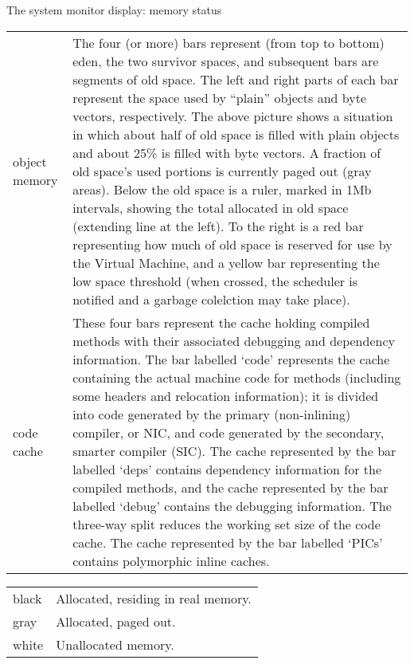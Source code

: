 \documentclass[letterpaper,10pt,english]{sphinxmanual}
\begin{document}
\begin{threeparttable}
\capstart\caption{The system monitor display: memory status}\label{\detokenize{monitor:id3}}
\noindent\begin{tabulary}{\linewidth}{p{5cm} p{10cm}}
\hline
{}\relax &\relax \\
\hline
object memory
&
The four (or more) bars represent (from top to bottom) eden, the two survivor spaces, and subsequent
bars are segments of old space. The left and right parts of each bar represent the space used
by “plain” objects and byte vectors, respectively. The above picture shows a situation in which
about half of old space is filled with plain objects and about 25\% is filled with byte vectors. A fraction
of old space’s used portions is currently paged out (gray areas).
Below the old space is a ruler, marked in 1Mb intervals, showing the total allocated in old space
(extending line at the left). To the right is a red bar representing how much of old space is reserved
for use by the Virtual Machine, and a yellow bar representing the low space threshold (when
crossed, the scheduler is notified and a garbage colelction may take place).
\\
\hline
code cache
&
These four bars represent the cache holding compiled methods with their associated debugging and
dependency information. The bar labelled ‘code’ represents the cache containing the actual
machine code for methods (including some headers and relocation information); it is divided into
code generated by the primary (non-inlining) compiler, or NIC, and code generated by the
secondary, smarter compiler (SIC). The cache represented by the bar labelled ‘deps’ contains
dependency information for the compiled methods, and the cache represented by the bar labelled
‘debug’ contains the debugging information. The three-way split reduces the working set size of the
code cache. The cache represented by the bar labelled ‘PICs’ contains polymorphic inline caches.
\\
\hline\end{tabulary}

\end{threeparttable}




\noindent\begin{tabulary}{\linewidth}{p{5cm} p{10cm}}
\hline
{}\relax &\relax \\
\hline
black
&
Allocated, residing in real memory.
\\
\hline
gray
&
Allocated, paged out.
\\
\hline
white
&
Unallocated memory.
\\
\hline\end{tabulary}
\end{document}
